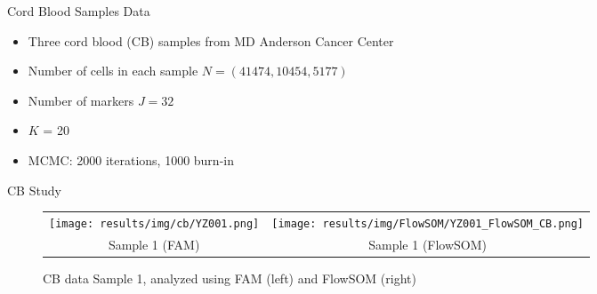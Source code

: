 \documentclass[ignorenonframetext,]{beamer}
\begin{document}

\begin{frame}{Cord Blood Samples Data}
  \begin{itemize}
    \setlength\itemsep{1em}
    \item Three cord blood (CB) samples from MD Anderson Cancer Center
    \item Number of cells in each sample $N = (41474,10454,5177)$
    \item Number of markers $J=32$
    \item $K$ = 20
    \item MCMC: 2000 iterations, 1000 burn-in
  \end{itemize}
\end{frame}

\begin{frame}{CB Study}
\vspace{-1em}\begin{figure}
  \begin{center}
  \begin{tabular}{cc}
  \texttt{[image: results/img/cb/YZ001.png]} &
  \texttt{[image: results/img/FlowSOM/YZ001\_FlowSOM\_CB.png]} \\
  {\small Sample 1 (FAM)} & {\small Sample 1 (FlowSOM)} \\
  \end{tabular}
  \end{center}
  \vspace{-0.05in}
  \caption{CB data Sample 1, analyzed using FAM (left) and FlowSOM (right)}
\end{figure}
\end{frame}
\end{document}
